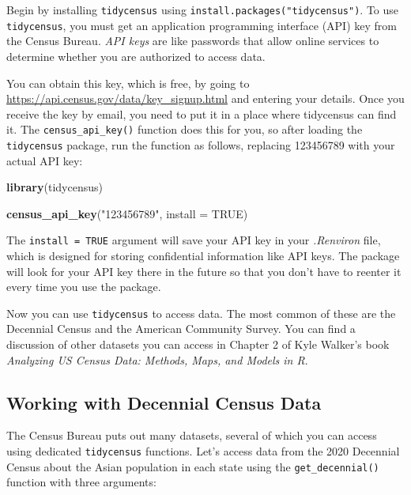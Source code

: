 \documentclass[
]{book}
\newenvironment{Shaded}{\begin{snugshade}}{\end{snugshade}}
\newcommand{\AttributeTok}[1]{\textcolor[rgb]{0.13,0.29,0.53}{#1}}
\newcommand{\ConstantTok}[1]{\textcolor[rgb]{0.56,0.35,0.01}{#1}}
\newcommand{\FunctionTok}[1]{\textcolor[rgb]{0.13,0.29,0.53}{\textbf{#1}}}
\newcommand{\NormalTok}[1]{#1}
\newcommand{\StringTok}[1]{\textcolor[rgb]{0.31,0.60,0.02}{#1}}
\begin{document}
Begin by installing \texttt{tidycensus} using \texttt{install.packages("tidycensus")}. To use \texttt{tidycensus}, you must get an application programming interface (API) key from the Census Bureau. \emph{API keys} are like passwords that allow online services to determine whether you are authorized to access data.

You can obtain this key, which is free, by going to \url{https://api.census.gov/data/key_signup.html} and entering your details. Once you receive the key by email, you need to put it in a place where tidycensus can find it. The \texttt{census\_api\_key()} function does this for you, so after loading the \texttt{tidycensus} package, run the function as follows, replacing 123456789 with your actual API key:

\begin{Shaded}
\begin{Highlighting}[]
\FunctionTok{library}\NormalTok{(tidycensus)}

\FunctionTok{census\_api\_key}\NormalTok{(}\StringTok{"123456789"}\NormalTok{, }\AttributeTok{install =} \ConstantTok{TRUE}\NormalTok{)}
\end{Highlighting}
\end{Shaded}

The \texttt{install\ =\ TRUE} argument will save your API key in your \emph{.Renviron} file, which is designed for storing confidential information like API keys. The package will look for your API key there in the future so that you don't have to reenter it every time you use the package.

Now you can use \texttt{tidycensus} to access data. The most common of these are the Decennial Census and the American Community Survey. You can find a discussion of other datasets you can access in Chapter 2 of Kyle Walker's book \emph{Analyzing US Census Data: Methods, Maps, and Models in R}.

\hypertarget{working-with-decennial-census-data}{%
\subsection*{Working with Decennial Census Data}\label{working-with-decennial-census-data}}

The Census Bureau puts out many datasets, several of which you can access using dedicated \texttt{tidycensus} functions. Let's access data from the 2020 Decennial Census about the Asian population in each state using the \texttt{get\_decennial()} function with three arguments:
\end{document}
